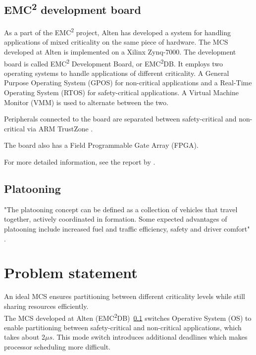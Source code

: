 \subsection{EMC\textsuperscript{2} development board}
\label{sec:mces}
As a part of the EMC\textsuperscript{2} project, Alten has developed a system for handling applications of mixed criticality on the same piece of hardware. The MCS developed at Alten is implemented on a Xilinx Zynq-7000. The development board is called EMC\textsuperscript{2} Development Board, or EMC\textsuperscript{2}DB. It employs two operating systems to handle applications of different criticality. A General Purpose Operating System (GPOS) for non-critical applications and a Real-Time Operating System (RTOS) for safety-critical applications. A Virtual Machine Monitor (VMM) is used to alternate between the two. %

Peripherals connected to the board are separated between safety-critical and non-critical via ARM TrustZone \cite{website:ARM}.

The board also has a Field Programmable Gate Array (FPGA).


For more detailed information, see the report by \cite{zaki2016}.

\subsection{Platooning}
\label{sec:platooning}
"The platooning concept can be defined as a collection of  vehicles that travel together, actively coordinated in formation. Some expected advantages of platooning include increased fuel and traffic  efficiency, safety and driver  comfort" \cite{bergenhem}.

\section{Problem statement}
\label{sec:problem}
An ideal MCS ensures partitioning between different criticality levels while still sharing resources efficiently.\\ %

The MCS developed at Alten (EMC\textsuperscript{2}DB)~\ref{sec:mces} switches Operative System (OS) to enable partitioning between safety-critical and non-critical applications, which takes about 2$\mu s$. This mode switch introduces additional deadlines which makes processor scheduling more difficult.\\ %

